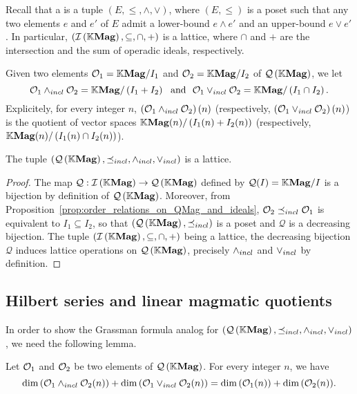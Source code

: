 Recall that a  is a tuple $\left(E,\leq,\wedge,\vee\right)$,
where $\left(E,\leq\right)$ is a poset such that any two elements $e$
and $e'$ of $E$ admit a lower-bound $e\wedge e'$ and an upper-bound
$e\vee e'$. In particular, $\left(\mathcal{I}\left(\mathbb{K}\mathbf{Mag}\right),\subseteq,\cap,+\right)$ is a
lattice, where $\cap$ and $+$ are the intersection and the sum of
operadic ideals, respectively.

Given two elements $\mathcal{O}_1=\mathbb{K}\mathbf{Mag}/I_1$ and $\mathcal{O}_2=\mathbb{K}\mathbf{Mag}/I_2$ of $\mathcal{Q}\left(\mathbb{K}\mathbf{Mag}\right)$,
we let
\begin{equation} \label{equ:definition_of_lattice_operations_of_QMag}
  \mathcal{O}_1\wedge_{incl} \mathcal{O}_2=\mathbb{K}\mathbf{Mag}/\left(I_1+I_2\right)\ \ \text{and}\ \
  \mathcal{O}_1\vee_{incl} \mathcal{O}_2=\mathbb{K}\mathbf{Mag}/\left(I_1\cap I_2\right).
\end{equation}
Explicitely, for every integer $n$, $\left(\mathcal{O}_1\wedge_{incl}\mathcal{O}_2\right)(n)$
(respectively, $\left(\mathcal{O}_1\vee_{incl}\mathcal{O}_2\right)(n)$) is the quotient of
vector spaces $\mathbb{K}\mathbf{Mag}(n)/\left(I_1(n)+I_2(n)\right)$ (respectively,
$\mathbb{K}\mathbf{Mag}(n)/\left(I_1(n)\cap I_2(n)\right)$).

\begin{Theorem} \label{thm:lattice_structure_of_QMag}
  The tuple $\left(\mathcal{Q}\left(\mathbb{K}\mathbf{Mag}\right),\preceq_{incl},\wedge_{incl},\vee_{incl}\right)$ is a lattice.
\end{Theorem}

\begin{proof}
  The map $\mathcal{Q}:\mathcal{I}\left(\mathbb{K}\mathbf{Mag}\right)\to\mathcal{Q}\left(\mathbb{K}\mathbf{Mag}\right)$ defined by $\mathcal{Q}(I)=\mathbb{K}\mathbf{Mag}/I$
  is a bijection by definition of $\mathcal{Q}\left(\mathbb{K}\mathbf{Mag}\right)$. Moreover, from
  Proposition~\ref{prop:order_relations_on_QMag_and_ideals},
  $\mathcal{O}_2\preceq_{incl}\mathcal{O}_1$ is equivalent to $I_1\subseteq I_2$, so that
  $\left(\mathcal{Q}\left(\mathbb{K}\mathbf{Mag}\right),\preceq_{incl}\right)$ is a poset and $\mathcal{Q}$ is a
  decreasing bijection. The tuple $\left(\mathcal{I}\left(\mathbb{K}\mathbf{Mag}\right),\subseteq,\cap,+\right)$
  being a lattice, the decreasing bijection $\mathcal{Q}$ induces
  lattice operations on $\mathcal{Q}\left(\mathbb{K}\mathbf{Mag}\right)$, precisely $\wedge_{incl}$ and $\vee_{incl}$ by
  definition.
\end{proof}


\subsection{Hilbert series and linear magmatic quotients}

In order to show the Grassman formula analog for $\left(\mathcal{Q}\left(\mathbb{K}\mathbf{Mag}\right),\preceq_{incl},\wedge_{incl},\vee_{incl}\right)$, we need the
following lemma.

\begin{Lemma} \label{lem:lattice_structure_and_coefficients_of_Hiblert_series}
  Let $\mathcal{O}_1$ and $\mathcal{O}_2$ be two elements of $\mathcal{Q}\left(\mathbb{K}\mathbf{Mag}\right)$. For every integer
  $n$, we have
  \begin{equation} \label{equ:lattice_structure_and_coefficients_of_the_Hiblert_series}
    \dim{\left(\mathcal{O}_1\wedge_{incl}\mathcal{O}_2(n)\right)}+
    \dim{\left(\mathcal{O}_1\vee_{incl}\mathcal{O}_2(n)\right)}=
    \dim{\left(\mathcal{O}_1(n)\right)}+\dim{\left(\mathcal{O}_2(n)\right)}.
  \end{equation}
\end{Lemma}


